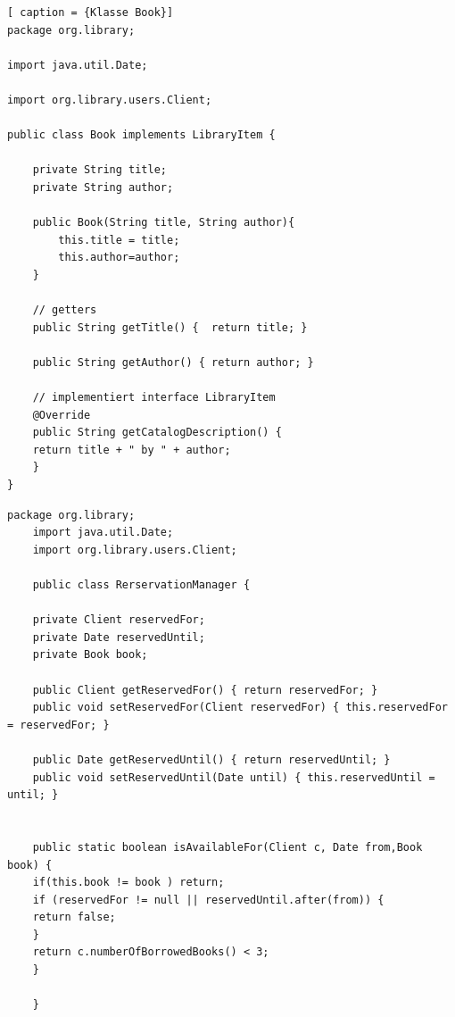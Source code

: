 \begin{lstlisting}[	caption = {Klasse Book}]
package org.library;

import java.util.Date;

import org.library.users.Client;

public class Book implements LibraryItem {
	
	private String title;
	private String author;
	
	public Book(String title, String author){
		this.title = title;
		this.author=author;
	}

	// getters
	public String getTitle() {  return title; }
	
	public String getAuthor() { return author; }

	// implementiert interface LibraryItem
	@Override
	public String getCatalogDescription() {
	return title + " by " + author;  
	}
}
\end{lstlisting}

%
%
%	

\begin{lstlisting}[caption = {RerservationManager}]
	package org.library;
	import java.util.Date;
	import org.library.users.Client;
	
	public class RerservationManager {
	
	private Client reservedFor;
	private Date reservedUntil;   	
	private Book book;
	
	public Client getReservedFor() { return reservedFor; }
	public void setReservedFor(Client reservedFor) { this.reservedFor = reservedFor; }
	
	public Date getReservedUntil() { return reservedUntil; }
	public void setReservedUntil(Date until) { this.reservedUntil = until; }
	
	
	public static boolean isAvailableFor(Client c, Date from,Book book) {
	if(this.book != book ) return;
	if (reservedFor != null || reservedUntil.after(from)) {
	return false;
	}
	return c.numberOfBorrowedBooks() < 3;
	}
	
	}
\end{lstlisting}

